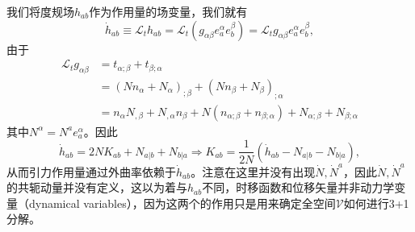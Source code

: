 \documentclass[hyperref, UTF8, a4paper]{ctexart}
\begin{document}
我们将度规场$h_{ab}$作为作用量的场变量，我们就有
\begin{equation*}
	\dot{h}_{ab} \equiv \mathcal{L}_{t} h_{ab} =\mathcal{L}_{t} (g_{\alpha \beta } e_{a}^{\alpha } e_{b}^{\beta } )=\mathcal{L}_{t} g_{\alpha \beta } e_{a}^{\alpha } e_{b}^{\beta } ,
\end{equation*}
由于
\begin{equation*}
	\begin{aligned}
		\mathcal{L}_{t} g_{\alpha \beta } & =t_{\alpha ;\beta } +t_{\beta ;\alpha }\\
		& =( Nn_{\alpha } +N_{\alpha })_{;\beta } +( Nn_{\beta } +N_{\beta })_{;\alpha }\\
		& =n_{\alpha } N_{,\beta } +N_{,\alpha } n_{\beta } +N( n_{\alpha ;\beta } +n_{\beta ;\alpha }) +N_{\alpha ;\beta } +N_{\beta ;\alpha }
	\end{aligned}
\end{equation*}
其中$N^{\alpha } =N^{a} e_{a}^{\alpha }$。因此
\begin{equation*}
	\dot{h}_{ab} =2NK_{ab} +N_{a|b} +N_{b|a} \Rightarrow K_{ab} =\frac{1}{2N} (\dot{h}_{ab} -N_{a|b} -N_{b|a} ),
\end{equation*}
从而引力作用量通过外曲率依赖于$\dot{h}_{ab}$。注意在这里并没有出现$\dot{N} ,\dot{N}^{a}$，因此$\dot{N} ,\dot{N}^{a}$的共轭动量并没有定义，这以为着与$h_{ab}$不同，时移函数和位移矢量并非动力学变量（dynamical variables），因为这两个的作用只是用来确定全空间$\mathscr{V}$如何进行3+1分解。
\end{document}
